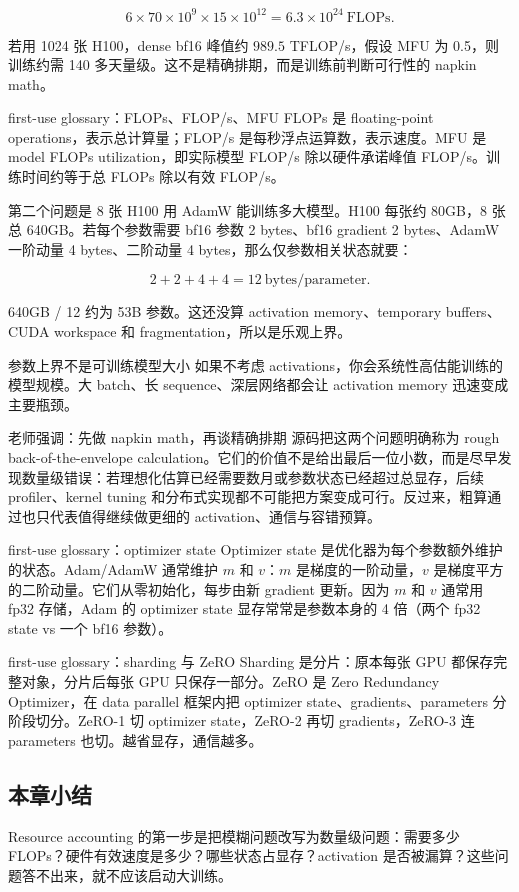 \[
6\times 70\times 10^9\times 15\times 10^{12}
=6.3\times 10^{24}\ \text{FLOPs}.
\]

若用 1024 张 H100，dense bf16 峰值约 \(989.5\) TFLOP/s，假设 MFU 为 0.5，则训练约需 140 多天量级。这不是精确排期，而是训练前判断可行性的 napkin math。

\begin{importantbox}{first-use glossary：FLOPs、FLOP/s、MFU}
FLOPs 是 floating-point operations，表示总计算量；FLOP/s 是每秒浮点运算数，表示速度。MFU 是 model FLOPs utilization，即实际模型 FLOP/s 除以硬件承诺峰值 FLOP/s。训练时间约等于总 FLOPs 除以有效 FLOP/s。
\end{importantbox}

第二个问题是 8 张 H100 用 AdamW 能训练多大模型。H100 每张约 80GB，8 张总 640GB。若每个参数需要 bf16 参数 2 bytes、bf16 gradient 2 bytes、AdamW 一阶动量 4 bytes、二阶动量 4 bytes，那么仅参数相关状态就要：

\[
2 + 2 + 4 + 4 = 12\ \text{bytes/parameter}.
\]

640GB / 12 约为 53B 参数。这还没算 activation memory、temporary buffers、CUDA workspace 和 fragmentation，所以是乐观上界。

\begin{warningbox}{参数上界不是可训练模型大小}
如果不考虑 activations，你会系统性高估能训练的模型规模。大 batch、长 sequence、深层网络都会让 activation memory 迅速变成主要瓶颈。
\end{warningbox}

\begin{knowledgebox}{老师强调：先做 napkin math，再谈精确排期}
源码把这两个问题明确称为 rough back-of-the-envelope calculation。它们的价值不是给出最后一位小数，而是尽早发现数量级错误：若理想化估算已经需要数月或参数状态已经超过总显存，后续 profiler、kernel tuning 和分布式实现都不可能把方案变成可行。反过来，粗算通过也只代表值得继续做更细的 activation、通信与容错预算。
\end{knowledgebox}

\begin{knowledgebox}{first-use glossary：optimizer state}
Optimizer state 是优化器为每个参数额外维护的状态。Adam/AdamW 通常维护 \(m\) 和 \(v\)：\(m\) 是梯度的一阶动量，\(v\) 是梯度平方的二阶动量。它们从零初始化，每步由新 gradient 更新。因为 \(m\) 和 \(v\) 通常用 fp32 存储，Adam 的 optimizer state 显存常常是参数本身的 4 倍（两个 fp32 state vs 一个 bf16 参数）。
\end{knowledgebox}

\begin{knowledgebox}{first-use glossary：sharding 与 ZeRO}
Sharding 是分片：原本每张 GPU 都保存完整对象，分片后每张 GPU 只保存一部分。ZeRO 是 Zero Redundancy Optimizer，在 data parallel 框架内把 optimizer state、gradients、parameters 分阶段切分。ZeRO-1 切 optimizer state，ZeRO-2 再切 gradients，ZeRO-3 连 parameters 也切。越省显存，通信越多。
\end{knowledgebox}

\subsection{本章小结}

Resource accounting 的第一步是把模糊问题改写为数量级问题：需要多少 FLOPs？硬件有效速度是多少？哪些状态占显存？activation 是否被漏算？这些问题答不出来，就不应该启动大训练。

